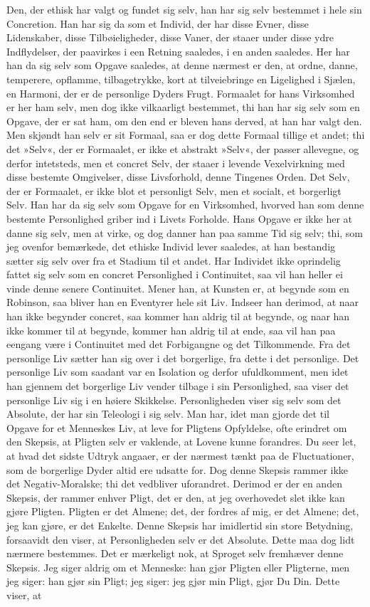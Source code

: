 \documentclass[12pt,a4paper]{article}
\begin{document}
Den, der ethisk har valgt og fundet sig selv, han har sig selv bestemmet i hele sin Concretion. Han har sig da som et Individ, der har disse Evner, disse Lidenskaber, disse Tilbøieligheder, disse Vaner, der staaer under disse ydre Indflydelser, der paavirkes i een Retning saaledes, i en anden saaledes. Her har han da sig selv som Opgave saaledes, at denne nærmest er den, at ordne, danne, temperere, opflamme, tilbagetrykke, kort at tilveiebringe en Ligelighed i Sjælen, en Harmoni, der er de personlige Dyders Frugt. Formaalet for hans Virksomhed er her ham selv, men dog ikke vilkaarligt bestemmet, thi han har sig selv som en Opgave, der er sat ham, om den end er bleven hans derved, at han har valgt den. Men skjøndt han selv er sit Formaal, saa er dog dette Formaal tillige et andet; thi det »Selv«, der er Formaalet, er ikke et abstrakt »Selv«, der passer allevegne, og derfor intetsteds, men et concret Selv, der staaer i levende Vexelvirkning med disse bestemte Omgivelser, disse Livsforhold, denne Tingenes Orden. Det Selv, der er Formaalet, er ikke blot et personligt Selv, men et socialt, et borgerligt Selv. Han har da sig selv som Opgave for en Virksomhed, hvorved han som denne bestemte Personlighed griber ind i Livets Forholde. Hans Opgave er ikke her at danne sig selv, men at virke, og dog danner han paa samme Tid sig selv; thi, som jeg ovenfor bemærkede, det ethiske Individ lever saaledes, at han bestandig sætter sig selv over fra et Stadium til et andet. Har Individet ikke oprindelig fattet sig selv som en concret Personlighed i Continuitet, saa vil han heller ei vinde denne senere Continuitet. Mener han, at Kunsten er, at begynde som en Robinson, saa bliver han en Eventyrer hele sit Liv. Indseer han derimod, at naar han ikke begynder concret, saa kommer han aldrig til at begynde, og naar han ikke kommer til at begynde, kommer han aldrig til at ende, saa vil han paa eengang være i Continuitet med det Forbigangne og det Tilkommende. Fra det personlige Liv sætter han sig over i det borgerlige, fra dette i det personlige. Det personlige Liv som saadant var en Isolation og derfor ufuldkomment, men idet han gjennem det borgerlige Liv vender tilbage i sin Personlighed, saa viser det personlige Liv sig i en høiere Skikkelse. Personligheden viser sig selv som det Absolute, der har sin Teleologi i sig selv. Man har, idet man gjorde det til Opgave for et Menneskes Liv, at leve for Pligtens Opfyldelse, ofte erindret om den Skepsis, at Pligten selv er vaklende, at Lovene kunne forandres. Du seer let, at hvad det sidste Udtryk angaaer, er der nærmest tænkt paa de Fluctuationer, som de borgerlige Dyder altid ere udsatte for. Dog denne Skepsis rammer ikke det Negativ-Moralske; thi det vedbliver uforandret. Derimod er der en anden Skepsis, der rammer enhver Pligt, det er den, at jeg overhovedet slet ikke kan gjøre Pligten. Pligten er det Almene; det, der fordres af mig, er det Almene; det, jeg kan gjøre, er det Enkelte. Denne Skepsis har imidlertid sin store Betydning, forsaavidt den viser, at Personligheden selv er det Absolute. Dette maa dog lidt nærmere bestemmes. Det er mærkeligt nok, at Sproget selv fremhæver denne Skepsis. Jeg siger aldrig om et Menneske: han gjør Pligten eller Pligterne, men jeg siger: han gjør sin Pligt; jeg siger: jeg gjør min Pligt, gjør Du Din. Dette viser, at 
\end{document}
